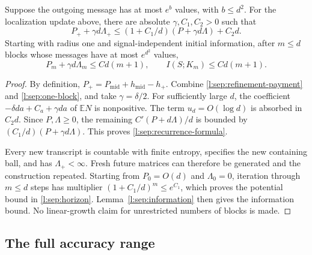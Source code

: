 \begin{proposition}
\label{l:sep:recurrence}
Suppose the outgoing message has at most \(e^b\) values, with
\(b\le d^2\).  For the localization update above, there are absolute
\(\gamma,C_1,C_2>0\) such that
\begin{equation}
 P_++\gamma d\Lambda_+
 \le(1+C_1/d)(P+\gamma d\Lambda)+C_2d.
 \label{l:sep:recurrence-formula}
\end{equation}
Starting with radius one and signal-independent initial information,
after \(m\le d\) blocks whose messages have at most \(e^{d^2}\)
values,
\begin{equation}
 P_m+\gamma d\Lambda_m\le C d(m+1),\qquad
 I(S;K_m)\le C d(m+1).
 \label{l:sep:horizon}
\end{equation}
\end{proposition}
\begin{proof}
By definition,
\(P_+=P_{\mathrm{mid}}+h_{\mathrm{mid}}-h_+\).
Combine \eqref{l:sep:refinement-payment} and
\eqref{l:sep:one-block}, and take \(\gamma=\delta/2\).
For sufficiently large \(d\), the coefficient
\(-\delta da+C_a+\gamma da\) of \(\mathbb E N\) is nonpositive.
The term \(u_d=O(\log d)\) is absorbed in \(C_2d\).  Since
\(P,\Lambda\ge0\), the remaining
\(C'(P+d\Lambda)/d\) is bounded by
\((C_1/d)(P+\gamma d\Lambda)\).  This proves
\eqref{l:sep:recurrence-formula}.

Every new transcript is countable with finite entropy, specifies the
new containing ball, and has \(\Lambda_+<\infty\).  Fresh future
matrices can therefore be generated and the construction repeated.
Starting from \(P_0=O(d)\) and \(\Lambda_0=0\), iteration through
\(m\le d\) steps has multiplier
\((1+C_1/d)^m\le e^{C_1}\), which proves the potential bound in
\eqref{l:sep:horizon}.  Lemma~\ref{l:sep:information} then gives
the information bound.  No linear-growth claim for unrestricted
numbers of blocks is made.
\end{proof}

\subsection{The full accuracy range}

